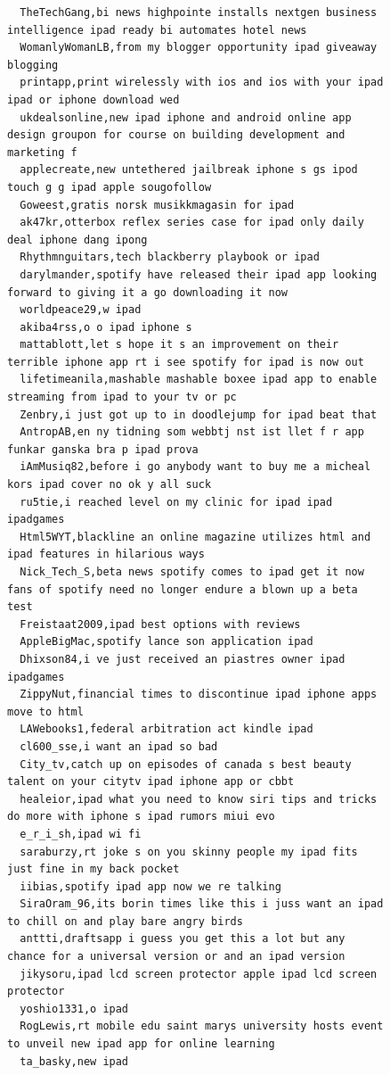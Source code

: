 \begin{figure}[htpb]
\begin{verbatim}
  TheTechGang,bi news highpointe installs nextgen business intelligence ipad ready bi automates hotel news
  WomanlyWomanLB,from my blogger opportunity ipad giveaway blogging
  printapp,print wirelessly with ios and ios with your ipad ipad or iphone download wed
  ukdealsonline,new ipad iphone and android online app design groupon for course on building development and marketing f
  applecreate,new untethered jailbreak iphone s gs ipod touch g g ipad apple sougofollow
  Goweest,gratis norsk musikkmagasin for ipad
  ak47kr,otterbox reflex series case for ipad only daily deal iphone dang ipong
  Rhythmnguitars,tech blackberry playbook or ipad
  darylmander,spotify have released their ipad app looking forward to giving it a go downloading it now
  worldpeace29,w ipad
  akiba4rss,o o ipad iphone s
  mattablott,let s hope it s an improvement on their terrible iphone app rt i see spotify for ipad is now out
  lifetimeanila,mashable mashable boxee ipad app to enable streaming from ipad to your tv or pc
  Zenbry,i just got up to in doodlejump for ipad beat that
  AntropAB,en ny tidning som webbtj nst ist llet f r app funkar ganska bra p ipad prova
  iAmMusiq82,before i go anybody want to buy me a micheal kors ipad cover no ok y all suck
  ru5tie,i reached level on my clinic for ipad ipad ipadgames
  Html5WYT,blackline an online magazine utilizes html and ipad features in hilarious ways
  Nick_Tech_S,beta news spotify comes to ipad get it now fans of spotify need no longer endure a blown up a beta test
  Freistaat2009,ipad best options with reviews
  AppleBigMac,spotify lance son application ipad
  Dhixson84,i ve just received an piastres owner ipad ipadgames
  ZippyNut,financial times to discontinue ipad iphone apps move to html
  LAWebooks1,federal arbitration act kindle ipad
  cl600_sse,i want an ipad so bad
  City_tv,catch up on episodes of canada s best beauty talent on your citytv ipad iphone app or cbbt
  healeior,ipad what you need to know siri tips and tricks do more with iphone s ipad rumors miui evo
  e_r_i_sh,ipad wi fi
  saraburzy,rt joke s on you skinny people my ipad fits just fine in my back pocket
  iibias,spotify ipad app now we re talking
  SiraOram_96,its borin times like this i juss want an ipad to chill on and play bare angry birds
  anttti,draftsapp i guess you get this a lot but any chance for a universal version or and an ipad version
  jikysoru,ipad lcd screen protector apple ipad lcd screen protector
  yoshio1331,o ipad
  RogLewis,rt mobile edu saint marys university hosts event to unveil new ipad app for online learning
  ta_basky,new ipad

\end{verbatim}
\end{figure}
